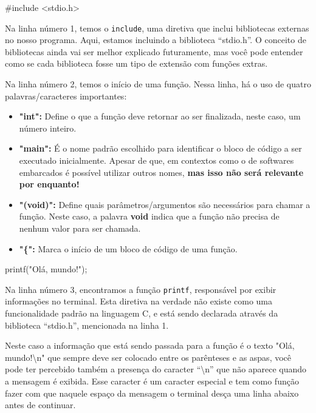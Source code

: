 \begin{excode}
    #include <stdio.h>
\end{excode}

Na linha número 1, temos o \texttt{include}, uma diretiva que inclui bibliotecas 
externas no nosso programa. Aqui, estamos incluindo a biblioteca ``stdio.h''. 
O conceito de bibliotecas ainda vai ser melhor explicado futuramente, mas você 
pode entender como se cada biblioteca fosse um tipo de extensão com funções 
extras.

\begin{excode}
    int main(void) {
\end{excode}

Na linha número 2, temos o início de uma função. Nessa linha, há o uso 
de quatro palavras/caracteres importantes:

\begin{itemize}
        \renewcommand{\labelitemi}{\tiny$\blacksquare$}
    \item \textbf{"int":} Define o que a função deve retornar ao ser 
        finalizada, neste caso, um número inteiro.
    \item \textbf{"main":} É o nome padrão escolhido para identificar o bloco 
        de código a ser executado inicialmente. Apesar de que, em contextos como 
        o de softwares embarcados é possível utilizar outros nomes, \textbf{mas 
        isso não será relevante por enquanto!}
    \item \textbf{"(void)":} Define quais parâmetros/argumentos são 
        necessários para chamar a função. Neste caso, a palavra \textbf{void} 
        indica que a função não precisa de nenhum valor para ser chamada.
    \item \textbf{"\{":} Marca o início de um bloco de código de uma função.
\end{itemize}

\begin{excode}
    printf("Olá, mundo!\n");
\end{excode}

Na linha número 3, encontramos a função \texttt{printf}, responsável por exibir 
informações no terminal. Esta diretiva na verdade não existe como uma 
funcionalidade padrão na linguagem C, e está sendo declarada através da 
biblioteca ``stdio.h'', mencionada na linha 1.

Neste caso a informação que está sendo passada para a função é o texto "Olá, 
mundo!\textbackslash n" que sempre deve ser colocado entre os parênteses e as 
aspas, você pode ter percebido também a presença do caracter 
``\textbackslash n'' que não aparece quando a mensagem é exibida. Esse 
caracter é um caracter especial e tem como função fazer com que naquele espaço 
da mensagem o terminal desça uma linha abaixo antes de continuar.


